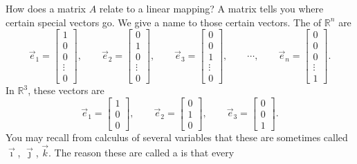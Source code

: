 How does a matrix $A$ relate to a linear mapping?
A matrix tells you where
certain special vectors go.  We give a name to those certain vectors.
The \emph{} of ${\mathbb R}^n$ are
\begin{equation*}
\vec{e}_1 =
\begin{bmatrix}
1 \\ 0 \\ 0 \\ \vdots \\ 0
\end{bmatrix} ,
\qquad
\vec{e}_2 =
\begin{bmatrix}
0 \\ 1 \\ 0 \\ \vdots \\ 0
\end{bmatrix} ,
\qquad
\vec{e}_3 =
\begin{bmatrix}
0 \\ 0 \\ 1 \\ \vdots \\ 0
\end{bmatrix} ,
\qquad
\cdots ,
\qquad
\vec{e}_n =
\begin{bmatrix}
0 \\ 0 \\ 0 \\ \vdots \\ 1
\end{bmatrix} .
\end{equation*}
In ${\mathbb R}^3$, these vectors are
\begin{equation*}
\vec{e}_1 =
\begin{bmatrix}
1 \\ 0 \\ 0
\end{bmatrix} ,
\qquad
\vec{e}_2 =
\begin{bmatrix}
0 \\ 1 \\ 0
\end{bmatrix} ,
\qquad
\vec{e}_3 =
\begin{bmatrix}
0 \\ 0 \\ 1
\end{bmatrix} .
\end{equation*}
You may recall from calculus of several variables that these are
sometimes called $\vec{\imath}$, $\vec{\jmath}$, $\vec{k}$.
The reason these are called a \emph{} is that every
